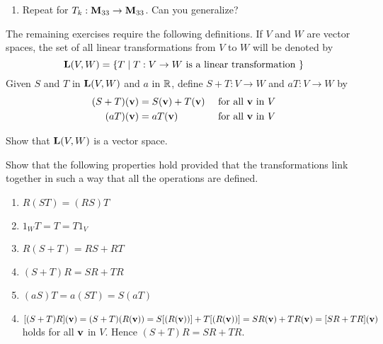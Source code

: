 \begin{multicols}{1}
\begin{ex}
\begin{enumerate}[label={\alph*.}]
\item Repeat for $T_{k} : \textbf{M}_{33} \to \textbf{M}_{33}$. Can you generalize?

\end{enumerate}
\end{ex}

The remaining exercises require the following definitions. If $V$ and $W$ are vector spaces, the set of all linear transformations from $V$ to $W$ will be denoted by 
\begin{equation*}
\textbf{L}(V, W) = \{T \mid T : V \to W \mbox{ is a linear transformation } \}
\end{equation*}
Given $S$ and $T$ in $\textbf{L}(V, W)$ and $a$ in $\mathbb{R}$, define $S + T : V \to W$ and $aT : V \to W$ by
\begin{align*}
(S + T)(\textbf{v}) & = S(\textbf{v}) + T(\textbf{v}) & \mbox{ for all } \textbf{v} \mbox{ in } V \\
(aT)(\textbf{v}) & = aT(\textbf{v}) & \mbox{ for all } \textbf{v} \mbox{ in } V
\end{align*}

\begin{ex}\label{ex:ex9_1_19}
Show that $\textbf{L}(V, W)$ is a vector space.
\end{ex}

\begin{ex}\label{ex:ex9_1_20}
Show that the following properties hold provided that the transformations link together in such a way that all the operations are defined.


\begin{enumerate}[label={\alph*.}]
\item $R(ST) = (RS)T$

\item $1_{W}T = T = T1_{V}$

\item $R(S + T) = RS + RT$

\item $(S + T)R = SR + TR$

\item $(aS)T = a(ST) = S(aT)$

\end{enumerate}
\begin{sol}
\begin{enumerate}[label={\alph*.}]
\setcounter{enumi}{3}
\item $[(S + T)R](\textbf{v}) = (S + T)(R(\textbf{v})) = S[(R(\textbf{v}))] + T[(R(\textbf{v}))] = SR(\textbf{v}) + TR(\textbf{v}) = [SR + TR](\textbf{v})$ holds for all $\textbf{v}$ in $V$. Hence $(S + T)R = SR + TR$.


\end{enumerate}
\end{sol}
\end{ex}
\end{multicols}
